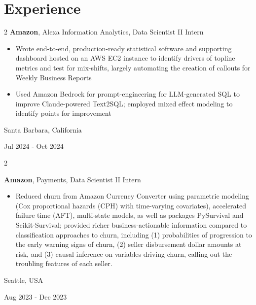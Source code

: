 \documentclass[10pt, letterpaper]{article}
\newenvironment{highlights}{
    \begin{itemize}[
        topsep=0.10 cm,
        parsep=0.10 cm,
        partopsep=0pt,
        itemsep=0pt,
        leftmargin=0.4 cm + 10pt
    ]
}{
    \end{itemize}
} %
\newenvironment{twocolentry}[2][]{
    \onecolentry
    \def\secondColumn{#2}
    \setcolumnwidth{\fill, 4.08 cm}
    \begin{paracol}{2}
}{
    \switchcolumn \raggedleft \secondColumn
    \end{paracol}
    \endonecolentry
} %
\begin{document}
    \section{Experience}

        \begin{twocolentry}{
            Santa Barbara, California

        Jul 2024 - Oct 2024

        }   \fontsize{14 pt}{20 pt}
            \textbf{Amazon}, Alexa Information Analytics, Data Scientist II Intern
            \begin{highlights}
                \item Wrote end-to-end, production-ready statistical software and supporting dashboard hosted on an AWS EC2 instance to identify drivers of topline metrics and test for mix-shifts, largely automating the creation of callouts for Weekly Business Reports
                \item Used Amazon Bedrock for prompt-engineering for LLM-generated SQL to improve Claude-powered Text2SQL; employed mixed effect modeling to identify points for improvement 
            \end{highlights}
        \end{twocolentry}

        \vspace{0.2 cm}

        \begin{twocolentry}{
            Seattle, USA

        Aug 2023 - Dec 2023

        }
        \fontsize{14 pt}{20 pt}
        \textbf{Amazon}, Payments, Data Scientist II Intern
            \begin{highlights}
                \item Reduced churn from Amazon Currency Converter using parametric modeling (Cox proportional hazards (CPH) with time-varying covariates), accelerated failure time (AFT), multi-state models, as well as packages PySurvival and Scikit-Survival; provided richer business-actionable information compared to classification approaches to churn, including (1) probabilities of progression to the early warning signs of churn, (2) seller disbursement dollar amounts at risk, and (3) causal inference on variables driving churn, calling out the troubling features of each seller.

            \end{highlights}
        \end{twocolentry}
\end{document}
